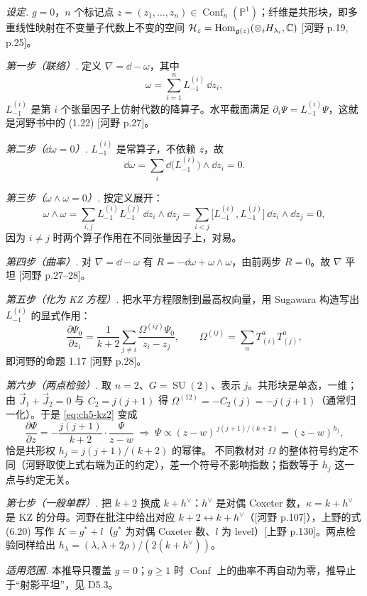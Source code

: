 \begin{derivation}
\emph{设定.} $g=0$，$n$ 个标记点 $z=(z_1,\dots,z_n)\in\operatorname{Conf}_n(\mathbb P^1)$；纤维是共形块，即多重线性映射在不变量子代数上不变的空间 $\mathcal{H}_z=\operatorname{Hom}_{\mathfrak g(z)}(\otimes_i H_{\lambda_i},\mathbb C)$ [河野 p.19, p.25]。

\emph{第一步（联络）.} 定义 $\nabla=\dd-\omega$，其中
\[
\omega=\sum_{i=1}^{n}L^{(i)}_{-1}\,\dd z_i ,
\]
$L^{(i)}_{-1}$ 是第 $i$ 个张量因子上仿射代数的降算子。水平截面满足 $\partial_i\Psi=L^{(i)}_{-1}\Psi$，这就是河野书中的 (1.22) [河野 p.27]。

\emph{第二步（$\dd\omega=0$）.} $L^{(i)}_{-1}$ 是常算子，不依赖 $z$，故
\[
\dd\omega=\sum_i \dd\bigl(L^{(i)}_{-1}\bigr)\wedge\dd z_i=0 .
\]

\emph{第三步（$\omega\wedge\omega=0$）.} 按定义展开：
\[
\omega\wedge\omega=\sum_{i,j}L^{(i)}_{-1}L^{(j)}_{-1}\,\dd z_i\wedge\dd z_j
=\sum_{i<j}\bigl[L^{(i)}_{-1},L^{(j)}_{-1}\bigr]\,\dd z_i\wedge\dd z_j=0,
\]
因为 $i\neq j$ 时两个算子作用在不同张量因子上，对易。

\emph{第四步（曲率）.} 对 $\nabla=\dd-\omega$ 有 $R=-\dd\omega+\omega\wedge\omega$，由前两步 $R=0$。故 $\nabla$ 平坦 [河野 p.27--28]。

\emph{第五步（化为 KZ 方程）.} 把水平方程限制到最高权向量，用 Sugawara 构造写出 $L^{(i)}_{-1}$ 的显式作用：
\begin{equation}
\frac{\partial\Psi_0}{\partial z_i}
=\frac{1}{k+2}\sum_{j\neq i}\frac{\Omega^{(ij)}\Psi_0}{z_i-z_j},
\qquad \Omega^{(ij)}=\sum_a T^a_{(i)}T^a_{(j)},
\label{eq:ch5-kz2}
\end{equation}
即河野的命题 1.17 [河野 p.28]。

\emph{第六步（两点检验）.} 取 $n=2$、$G=\operatorname{SU}(2)$、表示 $j$。共形块是单态，一维；由 $\vec J_1+\vec J_2=0$ 与 $C_2=j(j+1)$ 得 $\Omega^{(12)}=-C_2(j)=-j(j+1)$（通常归一化）。于是 \eqref{eq:ch5-kz2} 变成
\[
\frac{\partial\Psi}{\partial z}=-\frac{j(j+1)}{k+2}\cdot\frac{\Psi}{z-w}
\;\Longrightarrow\;
\Psi\propto(z-w)^{\,j(j+1)/(k+2)}=(z-w)^{h_j},
\]
恰是共形权 $h_j=j(j+1)/(k+2)$ 的幂律。\guess{} 不同教材对 $\Omega$ 的整体符号约定不同（河野取使上式右端为正的约定），差一个符号不影响指数；指数等于 $h_j$ 这一点与约定无关。

\emph{第七步（一般单群）.} 把 $k+2$ 换成 $k+h^\vee$：$h^\vee$ 是对偶 Coxeter 数，$\kappa=k+h^\vee$ 是 KZ 的分母。河野在批注中给出对应 $k+2\leftrightarrow k+h^\vee$（[河野 p.107]），上野的式 (6.20) 写作 $K=g^*+l$（$g^*$ 为对偶 Coxeter 数、$l$ 为 level）[上野 p.130]。两点检验同样给出 $h_\lambda=(\lambda,\lambda+2\rho)/(2(k+h^\vee))$。

\emph{适用范围.} 本推导只覆盖 $g=0$；$g\ge1$ 时 $\operatorname{Conf}$ 上的曲率不再自动为零，推导止于“射影平坦”，见 D5.3。
\end{derivation}

